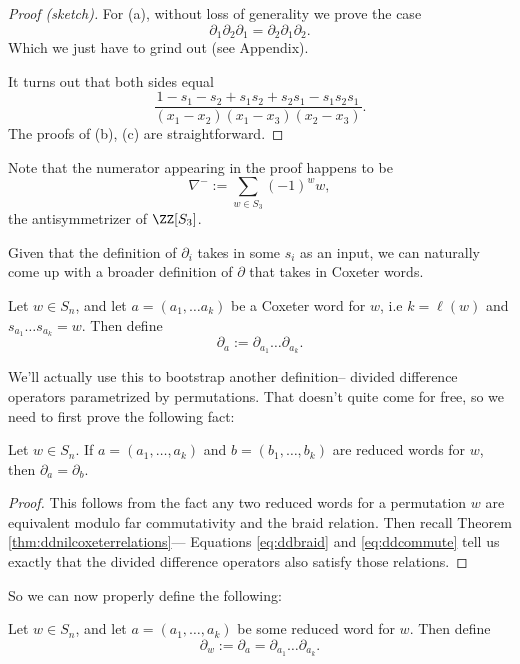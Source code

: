 \documentclass{article}
\begin{document}
\begin{proof}[Proof (sketch)]
    For (a), without loss of generality we prove the case
    \[
        \partial_1\partial_2\partial_1 = \partial_2\partial_1\partial_2.
    \]
    Which we just have to grind out (see Appendix).

    It turns out that both sides equal
    \[
        \frac{1 - s_1 - s_2 + s_1s_2 + s_2s_1 - s_1s_2s_1}{(x_1-x_2)(x_1-x_3)(x_2-x_3)}.
    \]
    The proofs of (b), (c) are straightforward.
\end{proof}

    Note that the numerator appearing in the proof happens to be
    \[
        \nabla^{-} := \sum_{w\in S_3}(-1)^w w,
    \]
    the antisymmetrizer of $\ZZ[S_3]$.

Given that the definition of $\partial_i$ takes in some $s_i$ as an input, we can naturally come up with a broader definition of $\partial$ that takes in Coxeter words.

\begin{definition}\label{def:ddword}
    Let $w \in S_n$, and let $a = (a_1, \ldots a_k)$ be a Coxeter word for $w$, i.e $k = \ell(w)$ and $s_{a_1}\ldots s_{a_k} = w$. Then define
    \[
        \partial_a := \partial_{a_1}\ldots\partial_{a_k}.
    \]
\end{definition}

We'll actually use this to bootstrap another definition-- divided difference operators parametrized by permutations. That doesn't quite come for free, so we need to first prove the following fact:

\begin{theorem}\label{thm:ddreducedwordequiv}
    Let $w \in S_n$.
    If $a=(a_1,\ldots,a_k)$ and $b=(b_1,\ldots,b_k)$ are reduced words for $w$, then $\partial_a = \partial_b$.
\end{theorem}

\begin{proof}
    This follows from the fact any two reduced words for a permutation $w$ are equivalent modulo far commutativity and the braid relation. 
    Then recall Theorem \ref{thm:ddnilcoxeterrelations}--- Equations \ref{eq:ddbraid} and \ref{eq:ddcommute} tell us exactly that the divided difference operators also satisfy those relations.
\end{proof}

So we can now properly define the following:

\begin{theorem}
    Let $w \in S_n$, and let $a=(a_1,\ldots,a_k)$ be some reduced word for $w$.
    Then define
    \[
        \partial_w := \partial_a = \partial_{a_1}\ldots\partial_{a_k}.
    \]
\end{theorem}
\end{document}
